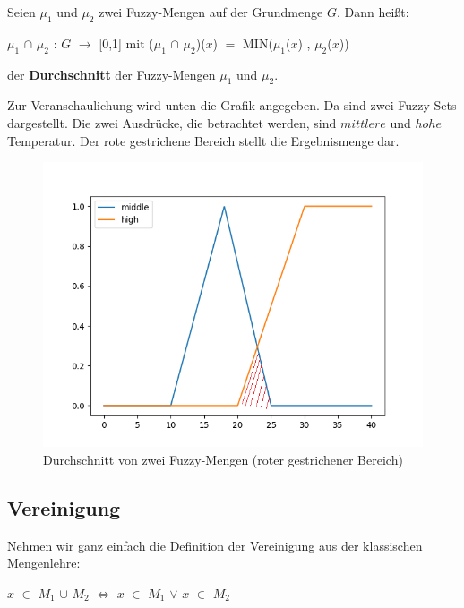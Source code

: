 \begin{definition}
	Seien $\mu_1$ und $\mu_2$ zwei Fuzzy-Mengen auf der Grundmenge $G$. Dann heißt:
	\begin{center}
		$\mu_1$ $\cap$ $\mu_2$ : $G$ $\rightarrow$ [0,1] $\text{mit}$ ($\mu_1$ $\cap$ $\mu_2$)($x$) $=$ MIN($\mu_1$($x$) , $\mu_2$($x$)) 
	\end{center}
	der \textbf{Durchschnitt} der Fuzzy-Mengen $\mu_1$ und $\mu_2$.
\end{definition} 

Zur Veranschaulichung wird unten die Grafik angegeben. Da sind zwei Fuzzy-Sets dargestellt. Die zwei Ausdrücke, die betrachtet werden, sind $mittlere$ und $hohe$ Temperatur. Der rote gestrichene Bereich stellt die Ergebnismenge dar.

\begin{figure}[htbp]
	\centering
	\includegraphics[scale=0.5]{images/und_high_middle_temp.png}
	\caption{Durchschnitt von zwei Fuzzy-Mengen (roter gestrichener Bereich)}\label{high_low_temp_intersection}
\end{figure}



\subsection{Vereinigung}

Nehmen wir ganz einfach die Definition der Vereinigung aus der klassischen Mengenlehre:
\begin{center}
	$x$  $\in$ $M_1$ $\cup$ $M_2$ $\Leftrightarrow$ $x$ $\in$ $M_1$ $\vee$ $x$ $\in$ $M_2$
\end{center}

